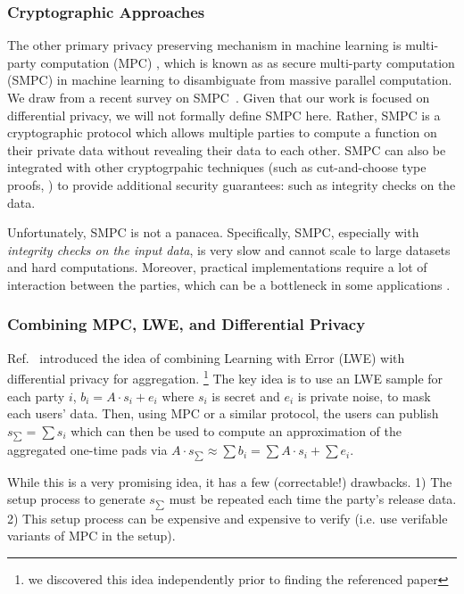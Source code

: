 \documentclass[11pt]{article}
\begin{document}
\subsubsection*{Cryptographic Approaches}
The other primary privacy preserving mechanism in machine learning is multi-party computation (MPC) \cite{yao1986generate}, which is known as as secure multi-party computation (SMPC) in machine learning to disambiguate from massive parallel computation.
We draw from a recent survey on SMPC~\cite{zhou2024secure}.
Given that our work is focused on differential privacy, we will not formally define SMPC here.
Rather, SMPC is a cryptographic protocol which allows multiple parties to compute a function on their private data without revealing their data to each other.
SMPC can also be integrated with other cryptogrpahic techniques (such as cut-and-choose type proofs, \cite{lindell2016fast}) to provide additional security guarantees: such as integrity checks on the data.

Unfortunately, SMPC is not a panacea.
Specifically, SMPC, especially with \emph{integrity checks on the input data}, is very slow and cannot scale to large datasets and hard computations.
Moreover, practical implementations require a lot of interaction between the parties, which can be a bottleneck in some applications \cite{zhao2019secure}.

\subsubsection*{Combining MPC, LWE, and Differential Privacy}
Ref.~\cite{stevens2021efficientdifferentiallyprivatesecure} introduced the idea of combining Learning with Error (LWE) with differential privacy for aggregation.
\footnote{we discovered this idea independently prior to finding the referenced paper}
The key idea is to use an LWE sample for each party $i$, $b_i = A \cdot s_i + e_i$ where $s_i$ is secret and $e_i$ is private noise, to mask each users' data.
Then, using MPC or a similar protocol, the users can publish $s_{\sum} = \sum s_i$ which can then be used to compute an approximation of the aggregated one-time pads via $A \cdot s_{\sum} \approx \sum b_i = \sum A \cdot s_i + \sum e_i$.

While this is a very promising idea, it has a few (correctable!) drawbacks.
1) The setup process to generate $s_{\sum}$ must be repeated each time the party's release data.
2) This setup process can be expensive and expensive to verify (i.e. use verifable variants of MPC in the setup).
\end{document}
